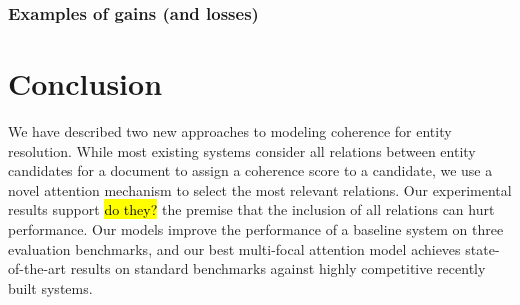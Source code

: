 \subsubsection{Examples of gains (and losses)}



\section{Conclusion}
\label{sec:End}

We have described two new approaches to modeling coherence for entity
resolution.  While most existing systems consider all relations
between entity candidates for a document to assign a coherence score
to a candidate, we use a novel attention mechanism to select the most
relevant relations.  Our experimental results support \hl{do they?}
the premise that the inclusion of all relations can hurt performance.
Our models improve the performance of a baseline system on three
evaluation benchmarks, and our best multi-focal attention model
achieves state-of-the-art results on standard benchmarks against
highly competitive recently built systems.



